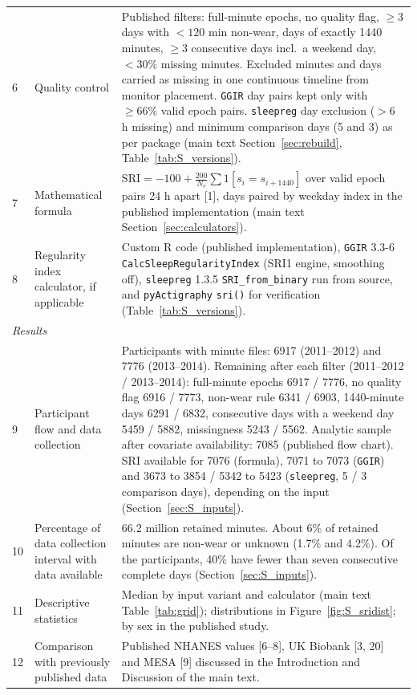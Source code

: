 {\begin{longtable}{p{}p{}p{}}
6 & Quality control & Published filters: full-minute epochs, no quality flag, $\geq 3$ days with $<120$ min non-wear, days of exactly 1440 minutes, $\geq 3$ consecutive days incl.\ a weekend day, $<30\%$ missing minutes. Excluded minutes and days carried as missing in one continuous timeline from monitor placement. \texttt{GGIR} day pairs kept only with $\geq 66\%$ valid epoch pairs. \texttt{sleepreg} day exclusion ($>6$ h missing) and minimum comparison days (5 and 3) as per package (main text Section~\ref{sec:rebuild}, Table~\ref{tab:S_versions}). \\
7 & Mathematical formula & $\mathrm{SRI} = -100 + \frac{200}{N_v}\sum 1[s_i = s_{i+1440}]$ over valid epoch pairs 24 h apart [1], days paired by weekday index in the published implementation (main text Section~\ref{sec:calculators}). \\
8 & Regularity index calculator, if applicable & Custom R code (published implementation), \texttt{GGIR} 3.3-6 \texttt{CalcSleepRegularityIndex} (SRI1 engine, smoothing off), \texttt{sleepreg} 1.3.5 \texttt{SRI\_from\_binary} run from source, and \texttt{pyActigraphy} \texttt{sri()} for verification (Table~\ref{tab:S_versions}). \\
\multicolumn{3}{l}{\emph{Results}} \\
9 & Participant flow and data collection & Participants with minute files: 6917 (2011--2012) and 7776 (2013--2014). Remaining after each filter (2011--2012 / 2013--2014): full-minute epochs 6917 / 7776, no quality flag 6916 / 7773, non-wear rule 6341 / 6903, 1440-minute days 6291 / 6832, consecutive days with a weekend day 5459 / 5882, missingness 5243 / 5562. Analytic sample after covariate availability: 7085 (published flow chart). SRI available for 7076 (formula), 7071 to 7073 (\texttt{GGIR}) and 3673 to 3854 / 5342 to 5423 (\texttt{sleepreg}, 5 / 3 comparison days), depending on the input (Section~\ref{sec:S_inputs}). \\
10 & Percentage of data collection interval with data available & 66.2 million retained minutes. About 6\% of retained minutes are non-wear or unknown (1.7\% and 4.2\%). Of the participants, 40\% have fewer than seven consecutive complete days (Section~\ref{sec:S_inputs}). \\
11 & Descriptive statistics & Median by input variant and calculator (main text Table~\ref{tab:grid}); distributions in Figure~\ref{fig:S_sridist}; by sex in the published study. \\
12 & Comparison with previously published data & Published NHANES values [6--8], UK Biobank [3, 20] and MESA [9] discussed in the Introduction and Discussion of the main text. \\

\end{longtable}}
